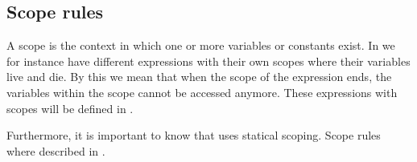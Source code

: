 \subsection*{Scope rules}

A scope is the context in which one or more variables or constants exist. In
\productname{} we for instance have different expressions with their own scopes
where their variables live and die. By this we mean that when the scope of the
expression ends, the variables within the scope cannot be accessed anymore.
These expressions with scopes will be defined in .

Furthermore, it is important to know that \productname{} uses statical scoping.
Scope rules where described in .








